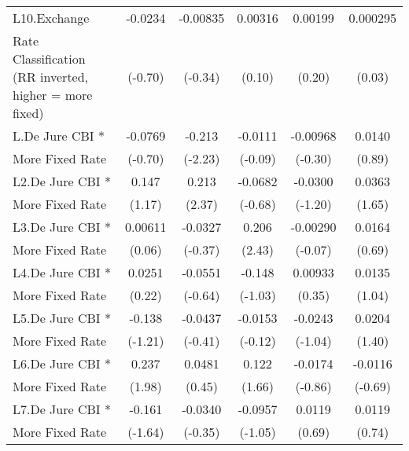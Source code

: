 {\begin{tabular}{l*{5}{c}}
\addlinespace
L10.Exchange    &  -0.0234         & -0.00835         &  0.00316         &  0.00199         & 0.000295         \\
Rate Classification (RR inverted, higher = more fixed)&  (-0.70)         &  (-0.34)         &   (0.10)         &   (0.20)         &   (0.03)         \\
\addlinespace
L.De Jure CBI * &  -0.0769         &   -0.213\sym{*}  &  -0.0111         & -0.00968         &   0.0140         \\
More Fixed Rate &  (-0.70)         &  (-2.23)         &  (-0.09)         &  (-0.30)         &   (0.89)         \\
\addlinespace
L2.De Jure CBI *&    0.147         &    0.213\sym{*}  &  -0.0682         &  -0.0300         &   0.0363         \\
More Fixed Rate &   (1.17)         &   (2.37)         &  (-0.68)         &  (-1.20)         &   (1.65)         \\
\addlinespace
L3.De Jure CBI *&  0.00611         &  -0.0327         &    0.206\sym{*}  & -0.00290         &   0.0164         \\
More Fixed Rate &   (0.06)         &  (-0.37)         &   (2.43)         &  (-0.07)         &   (0.69)         \\
\addlinespace
L4.De Jure CBI *&   0.0251         &  -0.0551         &   -0.148         &  0.00933         &   0.0135         \\
More Fixed Rate &   (0.22)         &  (-0.64)         &  (-1.03)         &   (0.35)         &   (1.04)         \\
\addlinespace
L5.De Jure CBI *&   -0.138         &  -0.0437         &  -0.0153         &  -0.0243         &   0.0204         \\
More Fixed Rate &  (-1.21)         &  (-0.41)         &  (-0.12)         &  (-1.04)         &   (1.40)         \\
\addlinespace
L6.De Jure CBI *&    0.237\sym{*}  &   0.0481         &    0.122         &  -0.0174         &  -0.0116         \\
More Fixed Rate &   (1.98)         &   (0.45)         &   (1.66)         &  (-0.86)         &  (-0.69)         \\
\addlinespace
L7.De Jure CBI *&   -0.161         &  -0.0340         &  -0.0957         &   0.0119         &   0.0119         \\
More Fixed Rate &  (-1.64)         &  (-0.35)         &  (-1.05)         &   (0.69)         &   (0.74)         \\

\end{tabular}}
